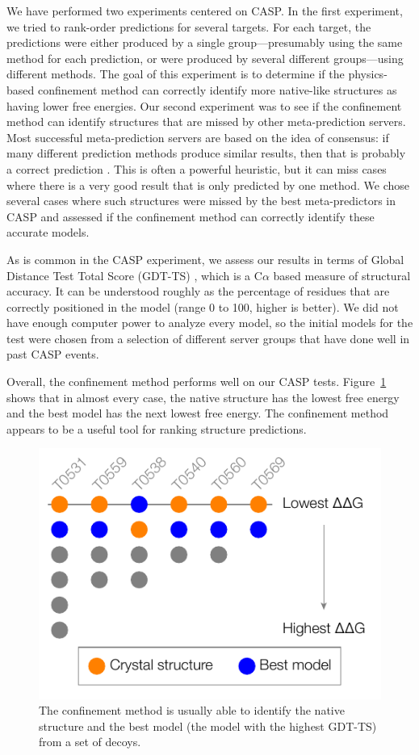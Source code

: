\documentclass[12pt]{article}
\begin{document}
We have performed two experiments centered on CASP. In the first experiment, we tried to rank-order predictions for
several targets. For each target, the predictions were either produced by a single group---presumably using the same
method for each prediction, or were produced by several different groups---using different methods. The goal of this
experiment is to determine if the physics-based confinement method can correctly identify more native-like structures as
having lower free energies. Our second experiment was to see if the confinement method can identify structures that are
missed by other meta-prediction servers. Most successful meta-prediction servers are based on the idea of consensus: if
many different prediction methods produce similar results, then that is probably a correct prediction \cite{Kryshtafovych2011,Wang2011}. This is
often a powerful heuristic, but it can miss cases where there is a very good result that is only predicted by one
method. We chose several cases where such structures were missed by the best meta-predictors in CASP and assessed if the
confinement method can correctly identify these accurate models.

As is common in the CASP experiment, we assess our results in terms of Global Distance Test Total Score (GDT-TS)
\cite{Zemla2003}, which is a C$\alpha$ based measure of structural accuracy. It can be understood roughly as the
percentage of residues that are correctly positioned in the model (range 0 to 100, higher is
better). We did not have enough
computer power to analyze every model, so the initial models for the test were chosen from a selection of different
server groups that have done well in past CASP events.

Overall, the confinement method performs well on our CASP tests. Figure~\ref{fig:summary_casp} shows that in almost
every case, the native structure has the lowest free energy and the best model has the next lowest free energy. The
confinement method appears to be a useful tool for ranking structure predictions.

\begin{figure}
\begin{center}
\includegraphics[width=3.5 in]{casp.pdf}
\end{center}
\caption{The confinement method is usually able to identify the native structure and the best model (the model with the
    highest GDT-TS) from a set of decoys.}
\label{fig:summary_casp}
\end{figure}
\end{document}
